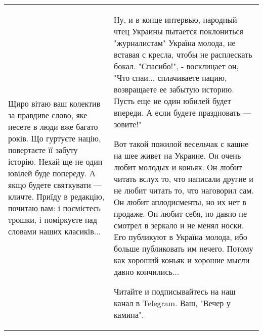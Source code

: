 \begin{longtable}{|p{}|p{}|}
Щиро вітаю ваш колектив за правдиве слово, яке несете в люди вже багато років.
Що гуртуєте націю, повертаєте її забуту історію. Нехай ще не один ювілей буде
попереду. А якщо будете святкувати — кличте. Приїду в редакцію, почитаю вам: і
посмієтесь трошки, і поміркуєте над словами наших класиків...

& 

Ну, и в конце интервью, народный чтец Украины пытается поклониться
"журналистам" Україна молода, не вставая с кресла, чтобы не расплескать бокал.
"Спасибо!", - восклицает он, "Что спаи... сплачиваете нацию, возвращаете ее
забытую историю. Пусть еще не один юбилей будет впереди. А если будете
праздновать — зовите!"

Вот такой пожилой весельчак с кашне на шее живет на Украине. Он очень любит
молодых и коньяк. Он любит читать вслух то, что написали другие и не любит
читать то, что наговорил сам. Он любит аплодисменты, но их нет в продаже. Он
любит себя, но давно не смотрел в зеркало и не менял носки. Его публикуют в
Україна молода, ибо больше публиковать им нечего. Потому как хороший коньяк и
хорошие мысли давно кончились...

Читайте и подписывайтесь на наш канал в Telegram.  Ваш, "Вечер у камина".

\\
  
\end{longtable}
